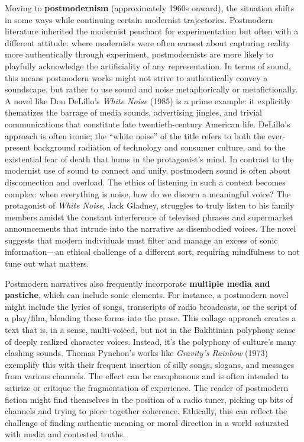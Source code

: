\documentclass[12pt]{report}
\begin{document}
Moving to \textbf{postmodernism} (approximately 1960s onward), the situation shifts in some ways while continuing certain modernist trajectories. Postmodern literature inherited the modernist penchant for experimentation but often with a different attitude: where modernists were often earnest about capturing reality more authentically through experiment, postmodernists are more likely to playfully acknowledge the artificiality of any representation. In terms of sound, this means postmodern works might not strive to authentically convey a soundscape, but rather to use sound and noise metaphorically or metafictionally. A novel like Don DeLillo’s \textit{White Noise} (1985) is a prime example: it explicitly thematizes the barrage of media sounds, advertising jingles, and trivial communications that constitute late twentieth-century American life. DeLillo’s approach is often ironic; the “white noise” of the title refers to both the ever-present background radiation of technology and consumer culture, and to the existential fear of death that hums in the protagonist’s mind. In contrast to the modernist use of sound to connect and unify, postmodern sound is often about disconnection and overload. The ethics of listening in such a context becomes complex: when everything is noise, how do we discern a meaningful voice? The protagonist of \textit{White Noise}, Jack Gladney, struggles to truly listen to his family members amidst the constant interference of televised phrases and supermarket announcements that intrude into the narrative as disembodied voices. The novel suggests that modern individuals must filter and manage an excess of sonic information—an ethical challenge of a different sort, requiring mindfulness to not tune out what matters.

Postmodern narratives also frequently incorporate \textbf{multiple media and pastiche}, which can include sonic elements. For instance, a postmodern novel might include the lyrics of songs, transcripts of radio broadcasts, or the script of a play/film, blending these forms into the prose. This collage approach creates a text that is, in a sense, multi-voiced, but not in the Bakhtinian polyphony sense of deeply realized character voices. Instead, it’s the polyphony of culture’s many clashing sounds. Thomas Pynchon’s works like \textit{Gravity’s Rainbow} (1973) exemplify this with their frequent insertion of silly songs, slogans, and messages from various channels. The effect can be cacophonous and is often intended to satirize or critique the fragmentation of experience. The reader of postmodern fiction might find themselves in the position of a radio tuner, picking up bits of channels and trying to piece together coherence. Ethically, this can reflect the challenge of finding authentic meaning or moral direction in a world saturated with media and contested truths.
\end{document}
